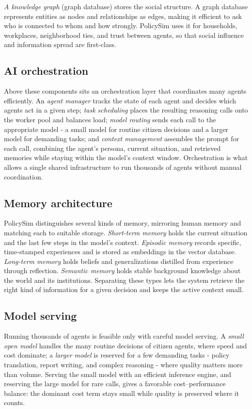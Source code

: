 \documentclass[conference]{IEEEtran}
\begin{document}
\emph{A knowledge graph} (graph database) stores the social structure. A graph database represents entities as nodes and relationships as edges, making it efficient to ask who is connected to whom and how strongly. PolicySim uses it for households, workplaces, neighborhood ties, and trust between agents, so that social influence and information spread are first-class.

\subsection{AI orchestration}
Above these components sits an orchestration layer that coordinates many agents efficiently. An \emph{agent manager} tracks the state of each agent and decides which agents act in a given step; \emph{task scheduling} places the resulting reasoning calls onto the worker pool and balances load; \emph{model routing} sends each call to the appropriate model - a small model for routine citizen decisions and a larger model for demanding tasks; and \emph{context management} assembles the prompt for each call, combining the agent's persona, current situation, and retrieved memories while staying within the model's context window. Orchestration is what allows a single shared infrastructure to run thousands of agents without manual coordination.

\subsection{Memory architecture}
PolicySim distinguishes several kinds of memory, mirroring human memory and matching each to suitable storage. \emph{Short-term memory} holds the current situation and the last few steps in the model's context. \emph{Episodic memory} records specific, time-stamped experiences and is stored as embeddings in the vector database. \emph{Long-term memory} holds beliefs and generalizations distilled from experience through reflection. \emph{Semantic memory} holds stable background knowledge about the world and its institutions. Separating these types lets the system retrieve the right kind of information for a given decision and keeps the active context small.

\subsection{Model serving}
Running thousands of agents is feasible only with careful model serving. A \emph{small open model} handles the many routine decisions of citizen agents, where speed and cost dominate; a \emph{larger model} is reserved for a few demanding tasks - policy translation, report writing, and complex reasoning - where quality matters more than volume. Serving the small model with an efficient inference engine, and reserving the large model for rare calls, gives a favorable cost--performance balance: the dominant cost term stays small while quality is preserved where it counts.
\end{document}
